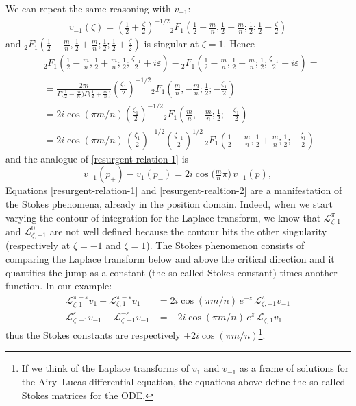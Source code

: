 \documentclass{article}
\newcommand{\laplace}{\mathcal{L}}
\theoremstyle{definition}
\theoremstyle{plain}
\newenvironment{draft}{\color{SlateBlue}}{\color{black}}
\begin{document}
\begin{draft}
We can repeat the same reasoning with $v_{-1}$:
\begin{align*}
    v_{-1}(\zeta)=  \left(\frac{1}{2}+\frac{\zeta}{2}\right)^{-1/2} {}_2F_1\left(\frac{1}{2}-\frac{m}{n},\frac{1}{2}+\frac{m}{n};\frac{1}{2};\frac{1}{2}+\frac{\zeta}{2}\right)
\end{align*}
and ${}_2F_1\left(\frac{1}{2}-\frac{m}{n},\frac{1}{2}+\frac{m}{n};\frac{1}{2};\frac{1}{2}+\frac{\zeta}{2}\right)$ is singular at $\zeta=1$. Hence
\begin{align*}
&{}_2F_1\left(\frac{1}{2}-\frac{m}{n},\frac{1}{2}+\frac{m}{n};\frac{1}{2};\frac{\zeta_{-1}}{2}+i\varepsilon\right)-{}_2F_1\left(\frac{1}{2}-\frac{m}{n},\frac{1}{2}+\frac{m}{n};\frac{1}{2};\frac{\zeta_{-1}}{2}-i\varepsilon\right)=\\
&=\frac{2\pi i}{\Gamma\big(\tfrac{1}{2}-\tfrac{m}{n}\big)\Gamma\big(\tfrac{1}{2}+\tfrac{m}{n}\big)} \left(\frac{\zeta_{1}}{2}\right)^{-1/2} {}_2F_1\left(\frac{m}{n},-\frac{m}{n};\frac{1}{2};-\frac{\zeta_{1}}{2}\right) \\
&=2 i\cos(\pi m/n) \left(\frac{\zeta_{1}}{2}\right)^{-1/2} {}_2F_1\left(\frac{m}{n},-\frac{m}{n};\frac{1}{2};-\frac{\zeta_{1}}{2}\right) \\
&=2i \cos(\pi m/n)\, \left(\frac{\zeta_{1}}{2}\right)^{-1/2} \left(\frac{\zeta_{-1}}{2}\right)^{1/2}\, {}_2F_1\left(\frac{1}{2}-\frac{m}{n},\frac{1}{2}+\frac{m}{n};\frac{1}{2};-\frac{\zeta_{1}}{2}\right)
\end{align*}
and the analogue of \eqref{resurgent-relation-1} is 
\begin{equation}\label{resurgent-realtion-2}
v_{-1}(p_+) - v_1(p_-)=2i \cos\big(\tfrac{m}{n}\pi\big)\,v_{-1}(p),
\end{equation}
Equations \eqref{resurgent-relation-1} and \eqref{resurgent-realtion-2} are a manifestation of the Stokes phenomena, already in the position domain. Indeed, when we start varying the contour of integration for the Laplace transform, we know that $\laplace_{\zeta,1}^\pi$ and $\laplace_{\zeta,-1}^0$ are not well defined because the contour hits the other singularity (respectively at $\zeta=-1$ and $\zeta=1$). The Stokes phenomenon consists of comparing the Laplace transform below and above the critical direction and it quantifies the jump as a constant (the so-called Stokes constant) times another function. In our example:
\begin{align*}
    \laplace_{\zeta,1}^{\pi+\varepsilon} v_1-\laplace_{\zeta,1}^{\pi-\varepsilon} v_1 & = 2 i \cos(\pi m/n) \, e^{-z}\, \laplace_{\zeta,-1}^{\pi} v_{-1} \\
    \laplace_{\zeta,-1}^{\varepsilon} v_{-1}-\laplace_{\zeta,-1}^{-\varepsilon} v_{-1} & = - 2 i \cos(\pi m/n)  \, e^z \, \laplace_{\zeta,1} v_{1} 
\end{align*}
thus the Stokes constants are respectively $\pm 2i \cos(\pi m/n)$\footnote{If we think of the Laplace transforms of $v_1$ and $v_{-1}$ as a frame of solutions for the Airy--Lucas differential equation, the equations above define the so-called Stokes matrices for the ODE.}. 


\end{draft}
\end{document}

